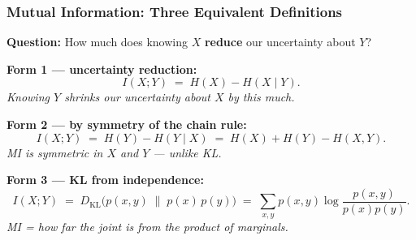 \documentclass[aspectratio=169]{beamer}
\begin{document}
\begin{frame}
\frametitle{Mutual Information: Three Equivalent Definitions}

\small
\textbf{Question:} How much does knowing $X$ \textbf{reduce} our uncertainty about $Y$?

\vspace{0.15cm}
\textbf{Form 1 — uncertainty reduction:}
$$I(X;Y) \;=\; H(X) - H(X \mid Y).$$
\textit{Knowing $Y$ shrinks our uncertainty about $X$ by this much.}

\pause
\vspace{0.1cm}
\textbf{Form 2 — by symmetry of the chain rule:}
$$I(X;Y) \;=\; H(Y) - H(Y \mid X) \;=\; H(X) + H(Y) - H(X,Y).$$
\textit{MI is symmetric in $X$ and $Y$ — unlike KL.}

\pause
\vspace{0.1cm}
\textbf{Form 3 — KL from independence:}
$$I(X;Y) \;=\; D_{\text{KL}}\!\big(p(x,y) \;\|\; p(x)\,p(y)\big) \;=\; \sum_{x,y} p(x,y)\log\frac{p(x,y)}{p(x)p(y)}.$$
\textit{MI = how far the joint is from the product of marginals.}

\vspace{0.1cm}
\begin{center}
\end{center}
\end{frame}
\end{document}

